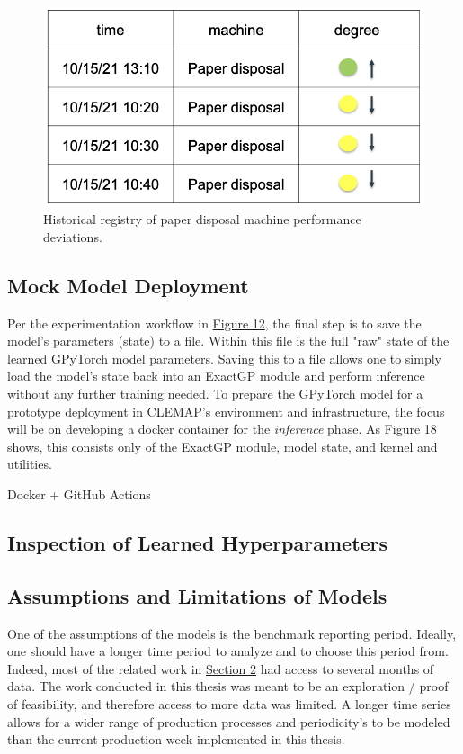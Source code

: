 \begin{figure}[h]
\centering
\graphicspath{ {./images/} }
\includegraphics[scale=0.49]{images/entsorgung_registry.png}
\caption{Historical registry of paper disposal machine performance deviations. }
\end{figure}

\subsection{Mock Model Deployment}

Per the experimentation workflow in \hyperlink{figure.12}{Figure 12}, the final step is to save the model's parameters (state) to a  file. Within this file is the full "raw" state of the learned GPyTorch model parameters. Saving this to a file allows one to simply load the model's state back into an ExactGP module and perform inference without any further training needed. To prepare the GPyTorch model for a prototype deployment in CLEMAP's environment and infrastructure, the focus will be on developing a docker container for the \textit{inference} phase. As \hyperlink{figure.18}{Figure 18} shows, this consists only of the ExactGP module, model state, and kernel and utilities.

Docker + GitHub Actions

\subsection{Inspection of Learned Hyperparameters}

\subsection{Assumptions and Limitations of Models}

One of the assumptions of the models is the benchmark reporting period. Ideally, one should have a longer time period to analyze and to choose this period from. Indeed, most of the related work in \hyperlink{section.2}{Section 2} had access to several months of data. The work conducted in this thesis was meant to be an exploration / proof of feasibility, and therefore access to more data was limited. A longer time series allows for a wider range of production processes and periodicity's to be modeled than the current production week implemented in this thesis.

